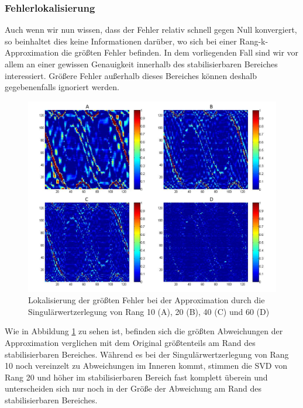 \documentclass[12pt,a4paper,twoside]{article}
\begin{document}
\subsubsection*{Fehlerlokalisierung}
Auch wenn wir nun wissen, dass der Fehler relativ schnell gegen Null konvergiert, so beinhaltet dies keine Informationen darüber, wo sich bei einer Rang-k-Approximation die größten Fehler befinden. In dem vorliegenden Fall sind wir vor allem an einer gewissen Genauigkeit innerhalb des stabilisierbaren Bereiches interessiert. Größere Fehler außerhalb dieses Bereiches können deshalb gegebenenfalls ignoriert werden.
\begin{figure}[h]
\center
	\includegraphics[scale=0.33]{SVD_errorloc.png}
	\caption{\label{pic:svd_errorloc}Lokalisierung der größten Fehler bei der Approximation durch die Singulärwertzerlegung von Rang 10 (A), 20 (B), 40 (C) und 60 (D)}
\end{figure}
Wie in Abbildung \ref{pic:svd_errorloc} zu sehen ist, befinden sich die größten Abweichungen der Approximation verglichen mit dem Original größtenteils am Rand des stabilisierbaren Bereiches. Während es bei der Singulärwertzerlegung von Rang 10 noch vereinzelt zu Abweichungen im Inneren kommt, stimmen die SVD von Rang 20 und höher im stabilisierbaren Bereich fast komplett überein und unterscheiden sich nur noch in der Größe der Abweichung am Rand des stabilisierbaren Bereiches.
\newpage
\end{document}
